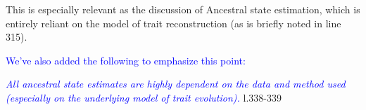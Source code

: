 \documentclass[12pt,letterpaper]{article}
\begin{document}
\noindent This is especially relevant as the discussion of Ancestral state estimation, which is entirely reliant on the model of trait reconstruction (as is briefly noted in line 315).

\textcolor{blue}{We've also added the following to emphasize this point:}

\textcolor{blue}{\textit{All ancestral state estimates are highly dependent on the data and method used (especially on the underlying model of trait evolution).}} l.338-339 %
\end{document}
